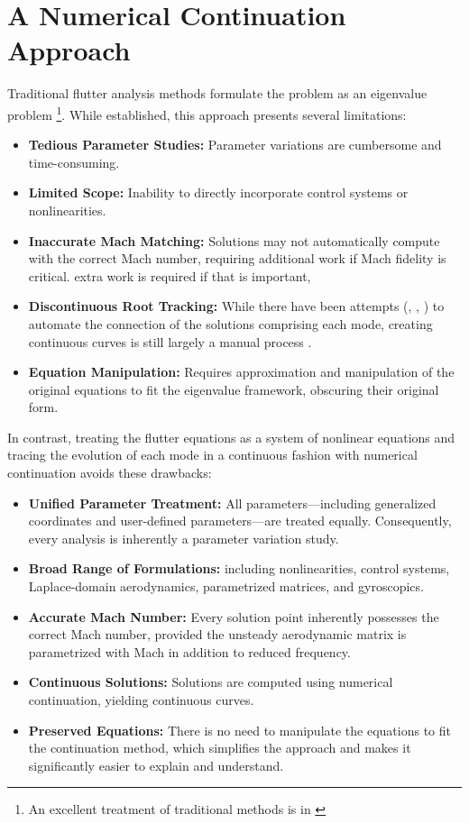 \documentclass[10pt,openany,twoside]{book}
\numberwithin{equation}{section}   %
\begin{document}
\section{A Numerical Continuation Approach}
Traditional flutter analysis methods formulate the problem as an eigenvalue
problem
\footnote{An excellent treatment of traditional methods is in
\cite{demasi2024introduction}}.
While established, this approach presents several limitations:
\begin{itemize}
	\item {\bf Tedious Parameter Studies:} Parameter variations are cumbersome
		and time-consuming.
	\item {\bf Limited Scope:} Inability to directly incorporate control systems or
		nonlinearities.
	\item {\bf Inaccurate Mach Matching:} Solutions may not automatically compute with the
	    correct Mach number, requiring additional work if Mach fidelity is critical.
		extra work is required if that is important,
	\item {\bf Discontinuous Root Tracking:} While there have been attempts
		(\cite{desmarais1974automated}, \cite{eldred1995new}, \cite{chen2000damping})
		to automate the connection of the solutions comprising each mode,
		creating continuous curves is still largely a manual process
		\cite{demasi2024introduction}.
	\item {\bf Equation Manipulation:} Requires approximation and manipulation of the original
	   equations to fit the eigenvalue framework, obscuring their original form.
\end{itemize}
In contrast, treating the flutter equations as a system of nonlinear
equations and tracing the evolution of each mode in a continuous fashion
with numerical continuation avoids these drawbacks:
\begin{itemize}
	\item {\bf Unified Parameter Treatment:} All parameters---including
		generalized coordinates
	    and user-defined parameters---are treated equally. Consequently,
		 every analysis is inherently a parameter variation study.
	\item {\bf Broad Range of Formulations:} including nonlinearities,
		control systems, Laplace-domain aerodynamics, parametrized matrices,
		and gyroscopics.
	\item {\bf Accurate Mach Number:} Every solution point inherently possesses the
	     correct Mach number, provided the unsteady aerodynamic matrix is parametrized
		  with Mach in addition to reduced frequency.
	\item {\bf Continuous Solutions:} Solutions are computed using
	    numerical continuation, yielding continuous curves.
	\item {\bf Preserved Equations:} There is no need to manipulate the equations to
	     fit the continuation method, which simplifies the approach and makes it
		  significantly easier to explain and understand.
\end{itemize}
\end{document}
